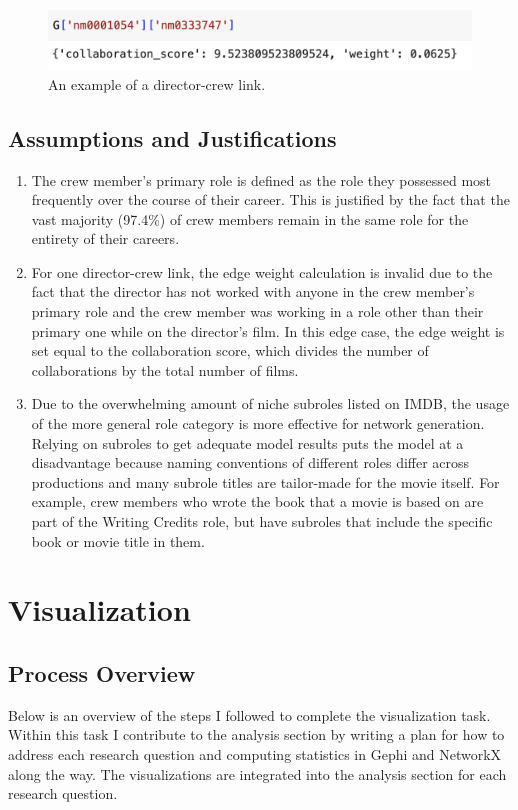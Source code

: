 \documentclass[12pt]{article}
\begin{document}
\begin{figure}[h!]
    \centering
    \includegraphics[width=0.5\linewidth]{DC_link.png}
    \caption{An example of a director-crew link.}
    \label{fig:dc_link}
\end{figure}


\subsection*{Assumptions and Justifications}
\begin{enumerate}
    \item The crew member's primary role is defined as the role they possessed most frequently over the course of their career. This is justified by the fact that the vast majority (97.4\%) of crew members remain in the same role for the entirety of their careers. 
    \item For one director-crew link, the edge weight calculation is invalid due to the fact that the director has not worked with anyone in the crew member's primary role and the crew member was working in a role other than their primary one while on the director's film. In this edge case, the edge weight is set equal to the collaboration score, which divides the number of collaborations by the total number of films. 
    \item Due to the overwhelming amount of niche subroles listed on IMDB, the usage of the more general role category is more effective for network generation. Relying on subroles to get adequate model results puts the model at a disadvantage because naming conventions of different roles differ across productions and many subrole titles are tailor-made for the movie itself. For example, crew members who wrote the book that a movie is based on are part of the Writing Credits role, but have subroles that include the specific book or movie title in them.
\end{enumerate}
        
\section*{Visualization}

\subsection*{Process Overview}
Below is an overview of the steps I followed to complete the visualization task. Within this task I contribute to the analysis section by writing a plan for how to address each research question and computing statistics in Gephi and NetworkX along the way. The visualizations are integrated into the analysis section for each research question.
\end{document}
